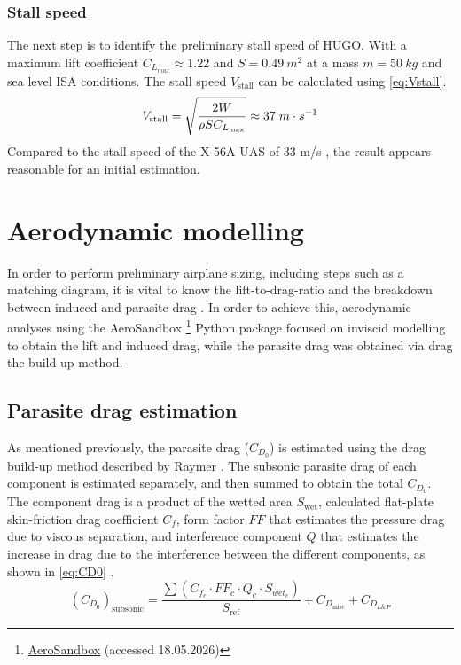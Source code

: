 \subsubsection*{Stall speed}
The next step is to identify the preliminary stall speed of HUGO. With a maximum lift coefficient $C_{L_{max}} \approx 1.22$ and $S = 0.49 \ m^2$ at a mass $m = 50 \ kg$ and sea level ISA conditions. The stall speed $V_\text{stall}$ can be calculated using \autoref{eq:Vstall}.
\begin{equation}
    V_\text{stall} = \sqrt{\frac{2W}{\rho S C_{L_\text{max}}}}\approx 37\hspace{0.1cm}m\cdot s^{-1}
    \label{eq:Vstall}
\end{equation}
Compared to the stall speed of the X-56A UAS of 33 m/s , the result appears reasonable for an initial estimation.\\


\section{Aerodynamic modelling}
\label{sec:aerodynamic_modelling}
In order to perform preliminary airplane sizing, including steps such as a matching diagram, it is vital to know the lift-to-drag-ratio and the breakdown between induced and parasite drag \cite{Vos}. In order to achieve this, aerodynamic analyses using the AeroSandbox \footnote{\href{https://aerosandbox.readthedocs.io/en/master/autoapi/aerosandbox/aerodynamics/aero_3D/lifting_line/index.html}{AeroSandbox} (accessed 18.05.2026)} Python package focused on inviscid modelling to obtain the lift and induced drag, while the parasite drag was obtained via drag the build-up method.

\subsection{Parasite drag estimation}
\label{subsec:parasite_drag_estimation}
As mentioned previously, the parasite drag ($C_{D_0}$) is estimated using the drag build-up method described by Raymer \cite{raymer1992aircraft}. The subsonic parasite drag of each component is estimated separately, and then summed to obtain the total $C_{D_0}$. The component drag is a product of the wetted area $S_\text{wet}$, calculated flat-plate skin-friction drag coefficient $C_f$, form factor $FF$ that estimates the pressure drag due to viscous separation, and interference component $Q$ that estimates the increase in drag due to the interference between the different components, as shown in \autoref{eq:CD0} \cite[p. 281]{raymer1992aircraft}.
\begin{equation}
    (C_{D_0})_\text{subsonic} = \frac{\sum(C_{f_c} \cdot FF_c \cdot Q_c \cdot S_{wet_c})}{S_\text{ref}} + C_{D_\text{misc}} + C_{D_{L\&P}}
    \label{eq:CD0}
\end{equation}

